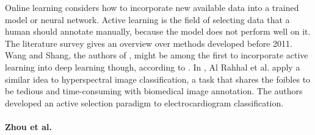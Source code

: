 Online learning considers how to incorporate new available data into a trained model or neural network. Active learning is the field of selecting data that a human should annotate manually, because the model does not perform well on it. The literature survey \cite{activesurvey} gives an overview over methods developed before 2011. Wang and Shang, the authors of \cite{dwang}, might be among the first to incorporate active learning into deep learning though, according to \cite{zhou}. In \cite{hyperspectral}, Al Rahhal et al. apply a similar idea to hyperspectral image classification, a task that shares the foibles to be tedious and time-consuming with biomedical image annotation. The authors developed an active selection paradigm to electrocardiogram classification. 

\paragraph{Zhou et al.}

